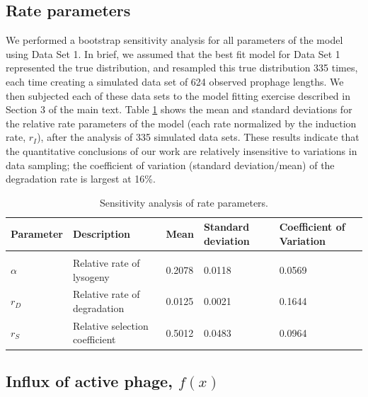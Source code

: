 \subsection{Rate parameters}

We performed a bootstrap sensitivity analysis for all parameters of the model using Data Set 1.  In brief, we assumed that the best fit model for Data Set 1 represented the true distribution, and resampled this true distribution 335 times, each time creating a simulated data set of 624 observed prophage lengths.  We then subjected each of these data sets to the model fitting exercise described in Section 3 of the main text.  Table \ref{table:sens_p} shows the mean and standard deviations for the relative rate parameters of the model (each rate normalized by the induction rate, $r_I$), after the analysis of 335 simulated data sets.  These results indicate that the quantitative conclusions of our work are relatively insensitive to variations in data sampling; the coefficient of variation (standard deviation/mean) of the degradation rate is largest at 16\%.

\renewcommand{\baselinestretch}{1}
\begin{center}
\begin{table}[H]
\centering
\begin{tabular}{ p{1.6cm}p{5cm}p{2cm}p{2cm}p{2.1cm} }
\hline
Parameter & Description  & Mean & Standard deviation & Coefficient of Variation  \\
\hline 
\\
 $\alpha $   & Relative rate of lysogeny &     0.2078&          0.0118 & 0.0569\\
 $r_D$   & Relative rate of degradation &       0.0125&         0.0021 & 0.1644\\
 $r_S$ &   Relative selection coefficient &    0.5012&     0.0483 & 0.0964\\
 \hline
\end{tabular}
\caption{Sensitivity analysis of rate parameters. }
\label{table:sens_p}
\end{table}
\end{center}

\renewcommand{\baselinestretch}{1.0}

\subsection [Influx of active phage]{Influx of active phage, $f(x)$}

